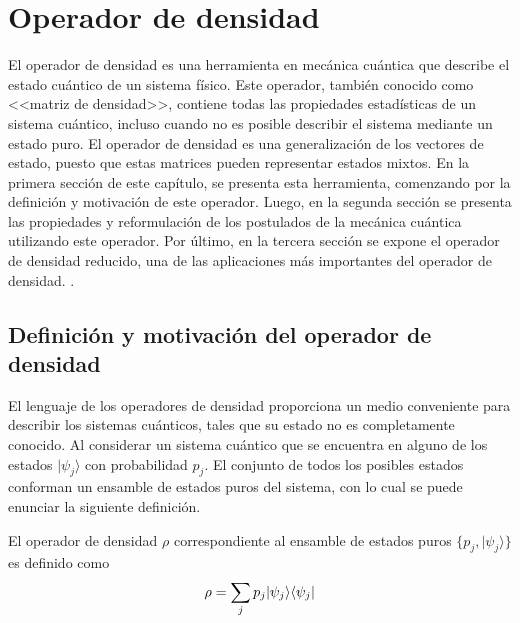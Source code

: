 \chapter{Operador de densidad}\label{OpDensidad}

El operador de densidad es una herramienta en mecánica cuántica que describe el
estado cuántico de un sistema físico. Este operador, también conocido como
<<matriz de densidad>>, contiene todas las propiedades estadísticas de un sistema cuántico, incluso cuando no es posible describir el sistema mediante un estado puro. El operador de densidad es una generalización de los vectores de estado, puesto que estas matrices pueden representar estados mixtos. %
En la primera sección de este capítulo, se presenta esta herramienta, comenzando por la definición y motivación de este operador. Luego, en la segunda sección  se presenta las propiedades y reformulación de los postulados de la mecánica cuántica utilizando este operador. Por último, en la tercera sección se expone el operador de densidad reducido, una de las aplicaciones más importantes del operador de densidad.
. 



\section{Definición y motivación  del operador de densidad}
El lenguaje de los operadores de densidad proporciona un  medio conveniente para describir los sistemas cuánticos, tales que su estado no es completamente conocido. Al considerar un sistema cuántico que se encuentra en alguno de los estados $|\psi_j \rangle $ con probabilidad $p_j$. El conjunto de todos los posibles estados conforman un ensamble
de estados puros del sistema, con lo cual se puede enunciar la siguiente definición. 

  \begin{definition} El operador de densidad $\rho$ correspondiente al ensamble de estados puros $\{p_j,|\psi_j \rangle \}$ es definido como {\cite{wilde2011classical}}
  	\begin{equation}{\label{defdensityoperator}}
  		\rho=\sum_{j}p_j|\psi_j\rangle \langle \psi_j|
  	\end{equation}
  
  	\end{definition}
  	

